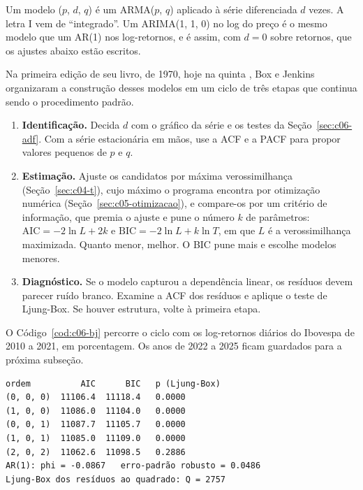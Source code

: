 Um modelo ($p$, $d$, $q$) é um ARMA($p$, $q$) aplicado à série diferenciada $d$ vezes. A letra I vem de ``integrado''. Um ARIMA(1, 1, 0) no log do preço é o mesmo modelo que um AR(1) nos log-retornos, e é assim, com $d = 0$ sobre retornos, que os ajustes abaixo estão escritos.

Na primeira edição de seu livro, de 1970, hoje na quinta \citep{box2015}, Box e Jenkins organizaram a construção desses modelos em um ciclo de três etapas que continua sendo o procedimento padrão.

\begin{enumerate}
  \item \textbf{Identificação.} Decida $d$ com o gráfico da série e os testes da Seção~\ref{sec:c06-adf}. Com a série estacionária em mãos, use a ACF e a PACF para propor valores pequenos de $p$ e $q$.
  \item \textbf{Estimação.} Ajuste os candidatos por máxima verossimilhança (Seção~\ref{sec:c04-t}), cujo máximo o programa encontra por otimização numérica (Seção~\ref{sec:c05-otimizacao}), e compare-os por um critério de informação, que premia o ajuste e pune o número $k$ de parâmetros: $\text{AIC} = -2\ln L + 2k$ e $\text{BIC} = -2\ln L + k\ln T$, em que $L$ é a verossimilhança maximizada. Quanto menor, melhor. O BIC pune mais e escolhe modelos menores.
  \item \textbf{Diagnóstico.} Se o modelo capturou a dependência linear, os resíduos devem parecer ruído branco. Examine a ACF dos resíduos e aplique o teste de Ljung-Box. Se houver estrutura, volte à primeira etapa.
\end{enumerate}

O Código~\ref{cod:c06-bj} percorre o ciclo com os log-retornos diários do Ibovespa de 2010 a 2021, em porcentagem. Os anos de 2022 a 2025 ficam guardados para a próxima subseção.

\Needspace{32mm}

\Needspace{38mm}
\begin{lstlisting}[style=saida]
ordem          AIC      BIC   p (Ljung-Box)
(0, 0, 0)  11106.4  11118.4   0.0000
(1, 0, 0)  11086.0  11104.0   0.0000
(0, 0, 1)  11087.7  11105.7   0.0000
(1, 0, 1)  11085.0  11109.0   0.0000
(2, 0, 2)  11062.6  11098.5   0.2886
AR(1): phi = -0.0867   erro-padrão robusto = 0.0486
Ljung-Box dos resíduos ao quadrado: Q = 2757
\end{lstlisting}

